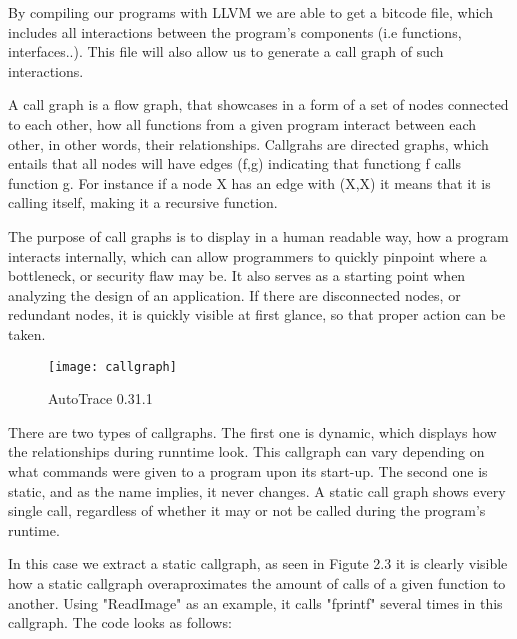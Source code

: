 By compiling our programs with LLVM we are able to get a bitcode file, which includes all interactions between the program's components (i.e functions, interfaces..). This file will also allow us to generate a call graph of such interactions.

A call graph is a flow graph, that showcases in a form of a set of nodes connected to each other, how all functions from a given program interact between each other, in other words, their relationships. Callgrahs are directed graphs, which entails that all nodes will have edges (f,g) indicating that functiong f calls function g. For instance if a node X has an edge with (X,X) it means that it is calling itself, making it a recursive function.

The purpose of call graphs is to display in a human readable way, how a program interacts internally, which can allow programmers to quickly pinpoint where a bottleneck, or security flaw may be. It also serves as a starting point when analyzing the design of an application. If there are disconnected nodes, or redundant nodes, it is quickly visible at first glance, so that proper action can be taken.

\begin{figure}[!htb]
	\caption{AutoTrace 0.31.1}
	\centering
	\texttt{[image: callgraph]}
\end{figure}

There are two types of callgraphs. The first one is dynamic, which displays how the relationships during runntime look. This callgraph can vary depending on what commands were given to a program upon its start-up. The second one is static, and as the name implies, it never changes. A static call graph shows every single call, regardless of whether it may or not be called during the program's runtime.\parencite{callgraphs}

In this case we extract a static callgraph, as seen in Figute 2.3 it is clearly visible how a static callgraph overaproximates the amount of calls of a given function to another. Using "ReadImage" as an example, it calls "fprintf" several times in this callgraph. The code looks as follows:


